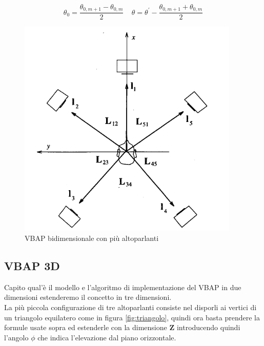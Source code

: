 \documentclass[12pt,a4paper]{report}
\begin{document}
\begin{equation}
\theta_0 = \dfrac{\theta_{0,m+1}-\theta_{0,m}}{2} \ \ \ \ \ \theta=\theta^{\prime}-\dfrac{\theta_{0,m+1}+\theta_{0,m}}{2}
\label{phidiverso}
\end{equation}


 \begin{figure}[htbp]
	\centering
	\includegraphics[scale=0.55]{figures/matrix5-1.png}
	\caption {VBAP bidimensionale con più altoparlanti}
	\label{fig:angoli5}
	\end{figure}



\subsection{VBAP 3D}

Capito qual'è il modello e l'algoritmo di implementazione del VBAP in due dimensioni estenderemo il concetto in tre dimensioni.\\

La più piccola configurazione di tre altoparlanti consiste nel disporli ai vertici di un triangolo equilatero come in figura \ref{fig:triangolo}, quindi ora basta prendere la formule usate sopra ed estenderle con la dimensione $\boldsymbol{Z}$ introducendo quindi l'angolo $\phi$ che indica l'elevazione dal piano orizzontale.
\end{document}
